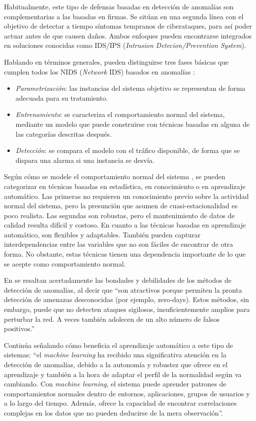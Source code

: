 Habitualmente, este tipo de defensas basadas en detección de anomalías son complementarias a las basadas en firmas.
Se sitúan en una segunda línea con el objetivo de detectar a tiempo síntomas tempranos de ciberataques, para así poder actuar antes de que causen daños.
Ambos enfoques pueden encontrarse integrados en soluciones conocidas como IDS/IPS (\emph{Intrusion Detecion/Prevention System}).

Hablando en términos generales, pueden distinguirse tres fases básicas que cumplen todos los NIDS (\emph{Network} IDS) basados en anomalías \cite{GarciaTeodoro_2009}:
\begin{itemize}
    \item \emph{Parametrización}: las instancias del sistema objetivo se representan de forma adecuada para su tratamiento.
    \item \emph{Entrenamiento}: se caracteriza el comportamiento normal del sistema, mediante un modelo que puede construirse con técnicas basadas en alguna de las categorías descritas después.
    \item \emph{Detección}: se compara el modelo con el tráfico disponible, de forma que se dispara una alarma si una instancia se desvía.
\end{itemize}

Según cómo se modele el comportamiento normal del sistema \cite{Lazaveric_2005}, se pueden categorizar en técnicas basadas en estadística, en conocimiento o en aprendizaje automático.
Las primeras no requieren un conocimiento previo sobre la actividad normal del sistema, pero la presunción que asumen de cuasi-estacionalidad es poco realista.
Las segundas son robustas, pero el mantenimiento de datos de calidad resulta difícil y costoso.
En cuanto a las técnicas basadas en aprendizaje automático, son flexibles y adaptables.
También pueden capturar interdependencias entre las variables que no son fáciles de encontrar de otra forma.
No obstante, estas técnicas tienen una dependencia importante de lo que se acepte como comportamiento normal.

En \cite{Alconzo_2019} se resaltan acertadamente las bondades y debilidades de los métodos de detección de anomalías, al decir que ``son atractivos porque permiten la pronta detección de amenazas desconocidas (por ejemplo, zero-days).
Estos métodos, sin embargo, puede que no detecten ataques sigilosos, insuficientemente amplios para perturbar la red.
A veces también adolecen de un alto número de falsos positivos.''

Continúa señalando cómo beneficia el aprendizaje automático a este tipo de sistemas: ``el \emph{machine learning} ha recibido una significativa atención en la detección de anomalías, debido a
la autonomía y robustez que ofrece en el aprendizaje y también a la hora de adaptar el perfil de la normalidad según va cambiando.
Con \emph{machine learning}, el sistema puede aprender patrones de comportamientos normales dentro de entornos, aplicaciones, grupos de usuarios y a lo largo del tiempo.
Además, ofrece la capacidad de encontrar correlaciones complejas en los datos que no pueden deducirse de la mera observación''.

